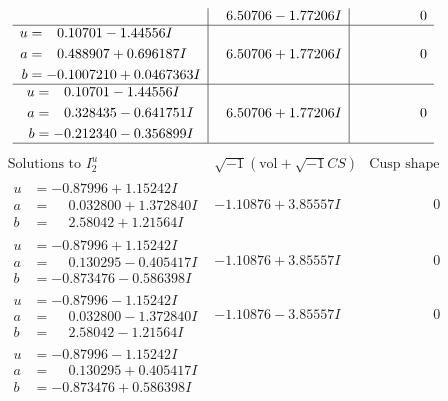 \documentclass[1p]{elsarticle_modified}
\theoremstyle{definition}
\newcommand{\I}{\sqrt{-1}}
\begin{document}
$$\begin{array}{c|c|c}
 & \phantom{-}6.50706 - 1.77206 I & \phantom{-0.000000 } 0 \\ \hline\begin{aligned}
u &= \phantom{-}0.10701 - 1.44556 I \\
a &= \phantom{-}0.488907 + 0.696187 I \\
b &= -0.1007210 + 0.0467363 I\end{aligned}
 & \phantom{-}6.50706 + 1.77206 I & \phantom{-0.000000 } 0 \\ \hline\begin{aligned}
u &= \phantom{-}0.10701 - 1.44556 I \\
a &= \phantom{-}0.328435 - 0.641751 I \\
b &= -0.212340 - 0.356899 I\end{aligned}
 & \phantom{-}6.50706 + 1.77206 I & \phantom{-0.000000 } 0\\
 \hline 
 \end{array}$$\newpage$$\begin{array}{c|c|c}  
\text{Solutions to }I^u_{2}& \I (\text{vol} + \sqrt{-1}CS) & \text{Cusp shape}\\
 \hline 
\begin{aligned}
u &= -0.87996 + 1.15242 I \\
a &= \phantom{-}0.032800 + 1.372840 I \\
b &= \phantom{-}2.58042 + 1.21564 I\end{aligned}
 & -1.10876 + 3.85557 I & \phantom{-0.000000 } 0 \\ \hline\begin{aligned}
u &= -0.87996 + 1.15242 I \\
a &= \phantom{-}0.130295 - 0.405417 I \\
b &= -0.873476 - 0.586398 I\end{aligned}
 & -1.10876 + 3.85557 I & \phantom{-0.000000 } 0 \\ \hline\begin{aligned}
u &= -0.87996 - 1.15242 I \\
a &= \phantom{-}0.032800 - 1.372840 I \\
b &= \phantom{-}2.58042 - 1.21564 I\end{aligned}
 & -1.10876 - 3.85557 I & \phantom{-0.000000 } 0 \\ \hline\begin{aligned}
u &= -0.87996 - 1.15242 I \\
a &= \phantom{-}0.130295 + 0.405417 I \\
b &= -0.873476 + 0.586398 I\end{aligned}

\end{array}$$
\end{document}
